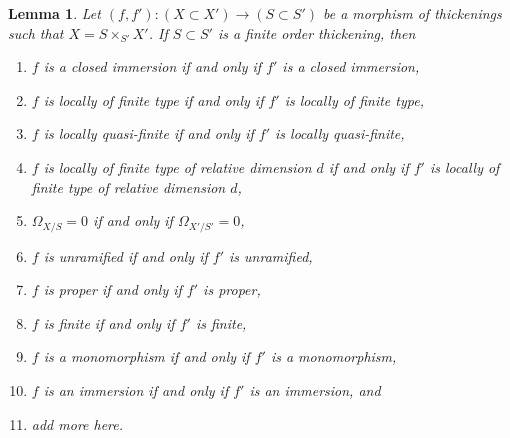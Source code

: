 \documentclass[10pt,a4paper]{amsart}
\theoremstyle{plain}
\newtheorem{lemma}[subsection]{Lemma}
\theoremstyle{definition}
\theoremstyle{remark}
\numberwithin{equation}{subsection}
\begin{document}
\begin{lemma}
\label{lemma-thicken-property-morphisms-cartesian}
Let $(f, f') : (X \subset X') \to (S \subset S')$ be a morphism
of thickenings such that $X = S \times_{S'} X'$. If $S \subset S'$
is a finite order thickening, then
\begin{enumerate}
\item $f$ is a closed immersion if and only if $f'$ is a closed immersion,
\item $f$ is locally of finite type if and only if $f'$ is
locally of finite type,
\item $f$ is locally quasi-finite if and only if $f'$ is locally
quasi-finite,
\item $f$ is locally of finite type of relative dimension $d$ if and
only if $f'$ is locally of finite type of relative dimension $d$,
\item $\Omega_{X/S} = 0$ if and only if $\Omega_{X'/S'} = 0$,
\item $f$ is unramified if and only if $f'$ is unramified,
\item $f$ is proper if and only if $f'$ is proper,
\item $f$ is finite if and only if $f'$ is finite,
\item $f$ is a monomorphism if and only if $f'$ is a monomorphism,
\item $f$ is an immersion if and only if $f'$ is an immersion, and
\item add more here.
\end{enumerate}
\end{lemma}
\end{document}
